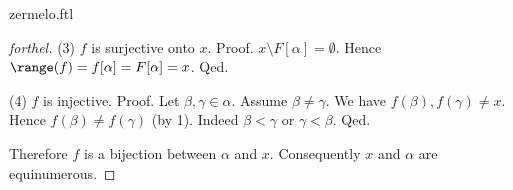\documentclass{naproche-library}
\begin{document}
\begin{smodule}{zermelo.ftl}
\begin{proof}[forthel]
    (3) $f$ is surjective onto $x$. \newline
    Proof.
      $x \setminus F[\alpha] = \emptyset$.
      Hence $\range(f)
        = f[\alpha]
        = F[\alpha]
        = x$.
    Qed.

    (4) $f$ is injective. \newline
    Proof.
      Let $\beta, \gamma \in \alpha$.
      Assume $\beta \neq \gamma$.
      We have $f(\beta), f(\gamma) \neq x$.
      Hence $f(\beta) \neq f(\gamma)$ (by 1).
      Indeed $\beta < \gamma$ or $\gamma < \beta$.
    Qed.

    Therefore $f$ is a bijection between $\alpha$ and $x$.
    Consequently $x$ and $\alpha$ are equinumerous.
  \end{proof}
\end{smodule}
\end{document}
